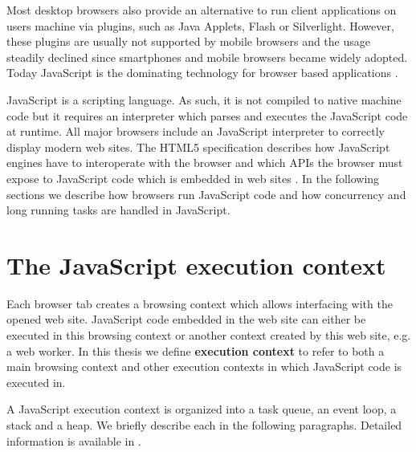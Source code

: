\documentclass[
	ruledheaders=section,%
	class=report,%
	thesis={type=bachelor},%
	accentcolor=9c,%
	custommargins=true,%
	marginpar=false,%
	parskip=half-,%
	fontsize=11pt,%
]{tudapub}
\begin{document}
  Most desktop browsers also provide an alternative to run client applications on users machine via plugins, such as Java Applets, Flash or Silverlight. However, these plugins are usually not supported by mobile browsers and the usage steadily declined since smartphones and mobile browsers became widely adopted. Today JavaScript is the dominating technology for browser based applications \cite{browser-plugin-usage}.

  JavaScript is a scripting language. As such, it is not compiled to native machine code but it requires an interpreter which parses and executes the JavaScript code at runtime. All major browsers include an JavaScript interpreter to correctly display modern web sites. The HTML5 specification describes how JavaScript engines have to interoperate with the browser and which APIs the browser must expose to JavaScript code which is embedded in web sites \cite{html5-specification}.
  In the following sections we describe how browsers run JavaScript code and how concurrency and long running tasks are handled in JavaScript.

  \section{The JavaScript execution context}

  Each browser tab creates a browsing context which allows interfacing with the opened web site. JavaScript code embedded in the web site can either be executed in this browsing context or another context created by this web site, e.g. a web worker. In this thesis we define \textbf{execution context} to refer to both a main browsing context and other execution contexts in which JavaScript code is executed in.

  A JavaScript execution context is organized into a task queue, an event loop, a stack and a heap. We briefly describe each in the following paragraphs. Detailed information is available in \cite{mdn-event-loop}.
\end{document}
